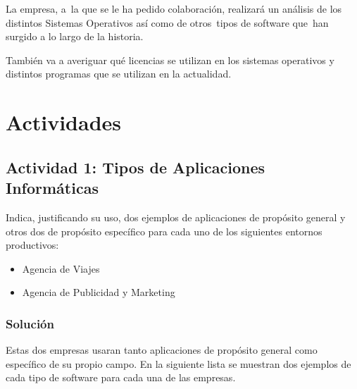 La empresa, a la que se le ha pedido colaboración, realizará un análisis de los distintos Sistemas Operativos así como de otros tipos de software que han surgido a lo largo de la historia.

También va a averiguar qué licencias se utilizan en los sistemas operativos y distintos programas que se utilizan en la actualidad.

\section{Actividades}

\subsection{Actividad  1: Tipos de Aplicaciones Informáticas}
Indica, justificando su uso, dos ejemplos de aplicaciones de propósito general y otros dos de propósito específico para cada uno de los siguientes entornos productivos:

\begin{itemize}
    \item Agencia de Viajes
    \item Agencia de Publicidad y Marketing
\end{itemize}

\subsubsection{Solución}
Estas dos empresas usaran tanto aplicaciones de propósito general como específico de su propio campo. En la siguiente lista se muestran dos ejemplos de cada tipo de software para cada una de las empresas.

